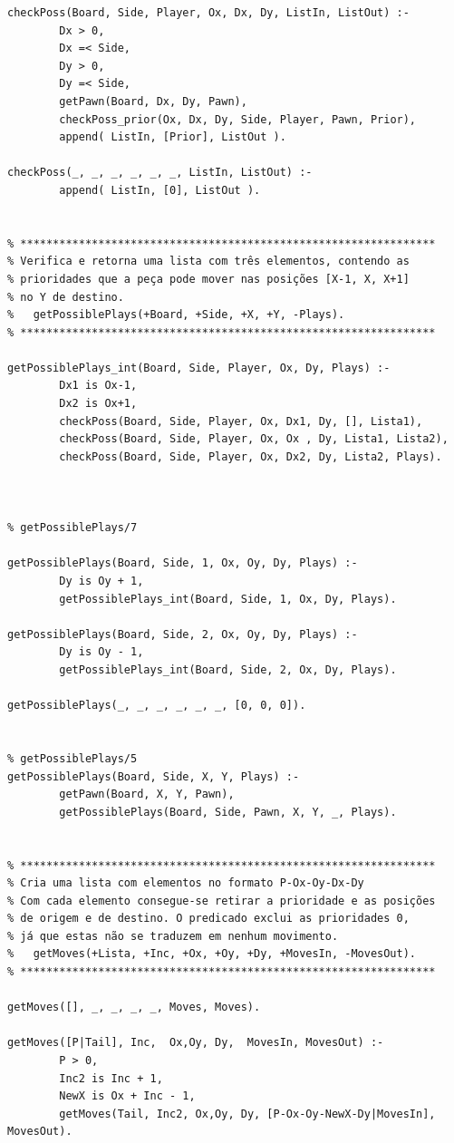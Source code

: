 \documentclass[15pt,a4paper]{article}
\begin{document}
\begin{lstlisting}
checkPoss(Board, Side, Player, Ox, Dx, Dy, ListIn, ListOut) :-
		Dx > 0,
		Dx =< Side,
		Dy > 0,
		Dy =< Side,
		getPawn(Board, Dx, Dy, Pawn),
		checkPoss_prior(Ox, Dx, Dy, Side, Player, Pawn, Prior),
		append( ListIn, [Prior], ListOut ).
		
checkPoss(_, _, _, _, _, _, ListIn, ListOut) :-
		append( ListIn, [0], ListOut ).
		

% ****************************************************************
% Verifica e retorna uma lista com três elementos, contendo as
% prioridades que a peça pode mover nas posições [X-1, X, X+1]
% no Y de destino.
%	getPossiblePlays(+Board, +Side, +X, +Y, -Plays).
% ****************************************************************   
		
getPossiblePlays_int(Board, Side, Player, Ox, Dy, Plays) :-
		Dx1 is Ox-1,
		Dx2 is Ox+1,
		checkPoss(Board, Side, Player, Ox, Dx1, Dy, [], Lista1),
		checkPoss(Board, Side, Player, Ox, Ox , Dy, Lista1, Lista2),
		checkPoss(Board, Side, Player, Ox, Dx2, Dy, Lista2, Plays).

		
		
% getPossiblePlays/7		

getPossiblePlays(Board, Side, 1, Ox, Oy, Dy, Plays) :-
		Dy is Oy + 1,
		getPossiblePlays_int(Board, Side, 1, Ox, Dy, Plays).
		
getPossiblePlays(Board, Side, 2, Ox, Oy, Dy, Plays) :-
		Dy is Oy - 1,
		getPossiblePlays_int(Board, Side, 2, Ox, Dy, Plays).
		
getPossiblePlays(_, _, _, _, _, _, [0, 0, 0]).
		

% getPossiblePlays/5
getPossiblePlays(Board, Side, X, Y, Plays) :-
		getPawn(Board, X, Y, Pawn),
		getPossiblePlays(Board, Side, Pawn, X, Y, _, Plays).
		

% ****************************************************************
% Cria uma lista com elementos no formato P-Ox-Oy-Dx-Dy
% Com cada elemento consegue-se retirar a prioridade e as posições
% de origem e de destino. O predicado exclui as prioridades 0,
% já que estas não se traduzem em nenhum movimento.
%	getMoves(+Lista, +Inc, +Ox, +Oy, +Dy, +MovesIn, -MovesOut).
% ****************************************************************

getMoves([], _, _, _, _, Moves, Moves).

getMoves([P|Tail], Inc,  Ox,Oy, Dy,  MovesIn, MovesOut) :-
		P > 0,
		Inc2 is Inc + 1,
		NewX is Ox + Inc - 1,
		getMoves(Tail, Inc2, Ox,Oy, Dy, [P-Ox-Oy-NewX-Dy|MovesIn], MovesOut).			


\end{lstlisting}
\end{document}
